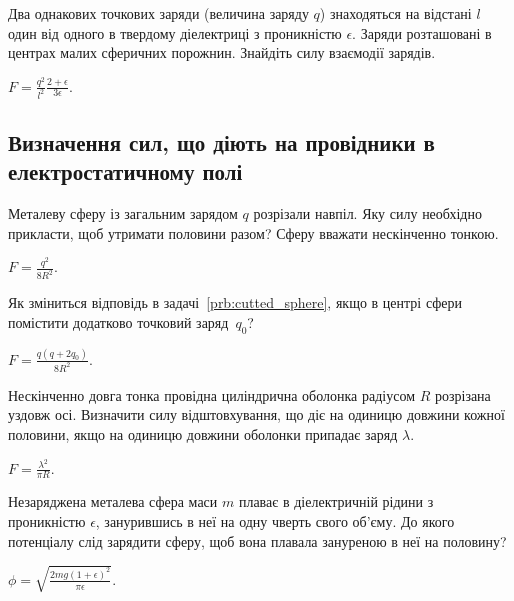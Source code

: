\begin{problem}
    Два однакових точкових заряди (величина заряду $q$) знаходяться на відстані $l$ один від одного в твердому діелектриці з проникністю $\epsilon$. Заряди розташовані в центрах малих сферичних порожнин. Знайдіть силу взаємодії зарядів. 
\begin{solution}
	$ F = \frac{q^2}{l^2} \frac{2 + \epsilon}{3\epsilon}.$
\end{solution}
\end{problem}


\subsection*{Визначення сил, що діють на провідники в електростатичному полі}

\begin{problem}\label{prb:cutted_sphere}%
Металеву сферу із загальним зарядом $q$ розрізали навпіл. Яку силу необхідно прикласти, щоб утримати половини разом? Сферу вважати нескінченно тонкою.
\begin{solution}
	$F = \frac{q^2}{8R^2}$.
\end{solution}
\end{problem}

\begin{problem}
Як зміниться відповідь в задачі~\ref{prb:cutted_sphere}, якщо в центрі сфери помістити додатково точковий заряд~$q_0$?
\begin{solution}
	$F = \frac{q(q + 2q_0)}{8R^2}$.
\end{solution}
\end{problem}

\begin{problem}
Нескінченно довга тонка провідна циліндрична оболонка радіусом $ R $ розрізана уздовж осі. Визначити силу відштовхування, що діє на одиницю довжини кожної половини, якщо на одиницю довжини оболонки припадає заряд $ \lambda $.
\begin{solution}
	$F = \frac{\lambda^2}{\pi R}$.
\end{solution}
\end{problem}

\begin{problem}
Незаряджена металева сфера маси $m$ плаває в діелектричній рідини з проникністю $\epsilon$, занурившись в неї на одну чверть свого об'єму. До якого потенціалу слід зарядити сферу, щоб вона плавала зануреною в неї на половину?
\begin{solution}
	$\phi = \sqrt{\frac{2mg(1+\epsilon)^2}{\pi\epsilon}}$.
\end{solution}
\end{problem}

